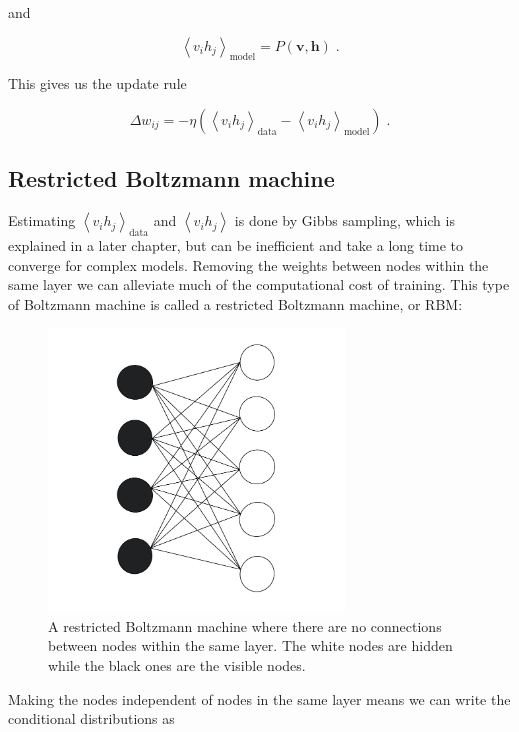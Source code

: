 and

\begin{equation}
    \left < v_i h_j \right >_{\text{model}} = P(\boldsymbol{v}, \boldsymbol{h}) \; .
\end{equation}

This gives us the update rule

\begin{equation}\label{eq:wdiff}
    \Delta w_{ij} = - \eta \left ( \left < v_i h_j \right >_{\text{data}} - \left < v_i h_j \right >_{\text{model}} \right ) \; . 
\end{equation}
\subsection{Restricted Boltzmann machine}
Estimating $ \left < v_i h_j \right >_{\text{data}}$ and $ \left < v_i h_j \right >$ is done by Gibbs sampling, which is explained in a later chapter, but can be inefficient and take a long time to converge for complex models. Removing the weights between nodes within the same layer we can alleviate much of the computational cost of training. This type of Boltzmann machine is called a restricted Boltzmann machine, or RBM:

\begin{figure}[H]
    \centering
    \includegraphics[width=0.7\textwidth]{Figures/Drawn/machinelearning/boltzrest.pdf}
    \caption{A restricted Boltzmann machine where there are no connections between nodes within the same layer. The white nodes are hidden while the black ones are the visible nodes.}
    \label{fig:boltzrest}
\end{figure}

Making the nodes independent of nodes in the same layer means we can write the conditional distributions as


